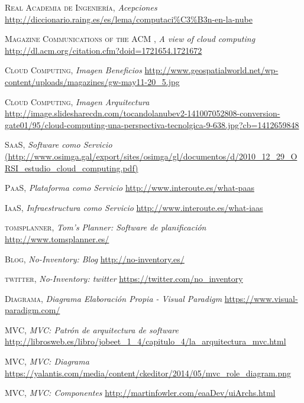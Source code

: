 \documentclass[a4paper,11pt]{book}
\begin{document}
\begin{thebibliography}{aaaa}
 \textsc{Real Academia de Ingeniería},
\textit{Acepciones}
\url{http://diccionario.raing.es/es/lema/computaci\%C3\%B3n-en-la-nube}


 \textsc{Magazine Communications of the ACM },
\textit{A view of cloud computing}
\url{http://dl.acm.org/citation.cfm?doid=1721654.1721672}


 \textsc{Cloud Computing},
\textit{Imagen Beneficios}
\url{http://www.geospatialworld.net/wp-content/uploads/magazines/gw-may11-20_5.jpg}

 \textsc{Cloud Computing},
\textit{Imagen Arquitectura}
\url{http://image.slidesharecdn.com/tocandolanubev2-141007052808-conversion-gate01/95/cloud-computing-una-perspectiva-tecnolgica-9-638.jpg?cb=1412659848}

 \textsc{SaaS},
\textit{Software como Servicio}
\url{(http://www.osimga.gal/export/sites/osimga/gl/documentos/d/2010_12_29_ORSI_estudio_cloud_computing.pdf)} 

 \textsc{PaaS},
\textit{Plataforma como Servicio}
\url{http://www.interoute.es/what-paas} 

 \textsc{IaaS},
\textit{Infraestructura como Servicio}
\url{http://www.interoute.es/what-iaas} 


 \textsc{tomsplanner},
\textit{Tom's Planner: Software de planificación}
\url{http://www.tomsplanner.es/}

 \textsc{Blog},
\textit{No-Inventory: Blog}
\url{http://no-inventory.es/}

 \textsc{twitter},
\textit{No-Inventory: twitter}
\url{https://twitter.com/no_inventory}

 \textsc{Diagrama},
\textit{Diagrama Elaboración Propia - Visual Paradigm}
\url{https://www.visual-paradigm.com/}



 \textsc{MVC},
\textit{MVC: Patrón de arquitectura de software }
\url{http://librosweb.es/libro/jobeet_1_4/capitulo_4/la_arquitectura_mvc.html}

 \textsc{MVC},
\textit{MVC: Diagrama}
\url{https://yalantis.com/media/content/ckeditor/2014/05/mvc_role_diagram.png}

 \textsc{MVC},
\textit{MVC: Componentes}
\url{http://martinfowler.com/eaaDev/uiArchs.html}


\end{thebibliography}
\end{document}
